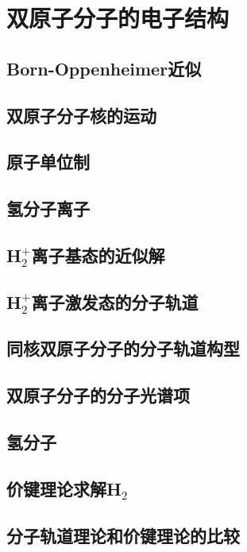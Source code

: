 \chapter{双原子分子的电子结构}
\section{Born-Oppenheimer近似}

\section{双原子分子核的运动}

\section{原子单位制}

\section{氢分子离子}

\section{H$_2^+$离子基态的近似解}

\section{H$_2^+$离子激发态的分子轨道}

\section{同核双原子分子的分子轨道构型}

\section{双原子分子的分子光谱项}

\section{氢分子}

\section{价键理论求解H$_2$}

\section{分子轨道理论和价键理论的比较}

